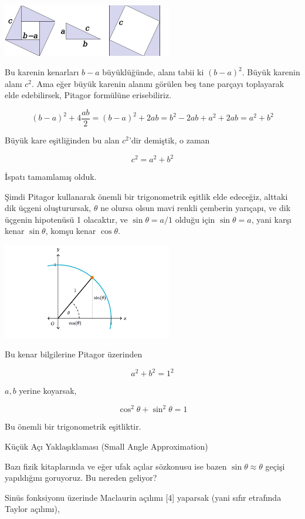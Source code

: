\documentclass[12pt,fleqn]{article}\usepackage{../../common}
\begin{document}
\includegraphics[width=20em]{Pythagoras.png}

Bu karenin kenarları $b-a$ büyüklüğünde, alanı tabii ki $(b-a)^2$. Büyük karenin
alanı $c^2$. Ama eğer büyük karenin alanını görülen beş tane parçayı toplayarak
elde edebilirsek, Pitagor formülüne erisebiliriz.

$$
(b-a)^2 + 4 \frac{ab}{2} = (b-a)^2 + 2 ab = b^2 -2ab + a^2 + 2ab = a^2 + b^2
$$

Büyük kare eşitliğinden bu alan $c^2$'dir demiştik, o zaman

$$
c^2 = a^2 + b^2
$$

İspatı tamamlamış olduk.

Şimdi Pitagor kullanarak önemli bir trigonometrik eşitlik elde edeceğiz, alttaki
dik üçgeni oluşturursak, $\theta$ ne olursa olsun mavi renkli çemberin yarıçapı,
ve dik üçgenin hipotenüsü 1 olacaktır, ve $\sin\theta = a / 1$ olduğu için
$\sin\theta = a$, yani karşı kenar $\sin\theta$, komşu kenar $\cos\theta$.

\includegraphics[width=20em]{PythagorSinCos.png}

Bu kenar bilgilerine Pitagor üzerinden

$$
a^2 + b^2 = 1^2 
$$

$a,b$ yerine koyarsak,

$$
\cos^2\theta + \sin^2\theta = 1
$$

Bu önemli bir trigonometrik eşitliktir.

Küçük Açı Yaklaşıklaması (Small Angle Approximation)

Bazı fizik kitaplarında ve eğer ufak açılar sözkonusu ise bazen $\sin\theta
\approx \theta$ geçişi yapıldığını goruyoruz. Bu nereden geliyor?

Sinüs fonksiyonu üzerinde Maclaurin açılımı [4] yaparsak (yani sıfır etrafında
Taylor açılımı),
\end{document}
